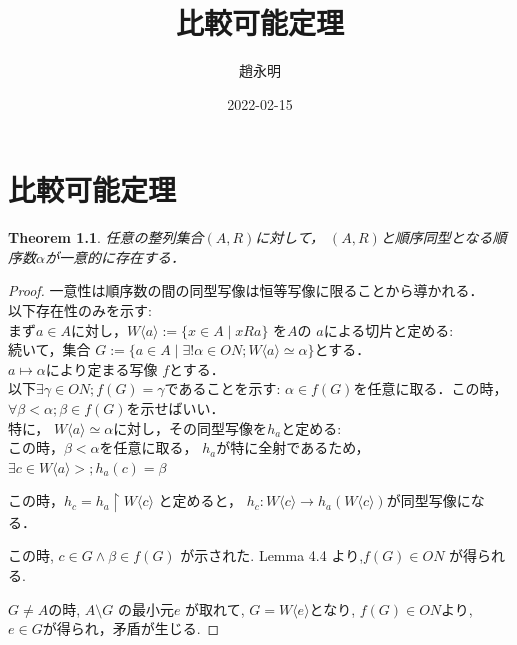 \documentclass[dvipdfmx]{jreport}
\newtheorem{theorem}{Theorem}[section]
\begin{document}
\title{比較可能定理}
\author{趙永明}
\date{2022-02-15}
\maketitle
\newpage
\tableofcontents
{}
\newpage
\chapter{比較可能定理}
\label{cha:比較可能定理}
\begin{theorem}
    任意の整列集合$(A,R)$に対して， $(A,R)$と順序同型となる順序数$\alpha$が一意的に存在する．
\end{theorem}
\begin{proof}
    一意性は順序数の間の同型写像は恒等写像に限ることから導かれる．\\
    以下存在性のみを示す:\\
    まず$a \in A$に対し，$W\langle a \rangle := \{ x \in A \mid xRa\} $ を$A$の $a$による切片と定める:\\
    続いて，集合 $G:=\{a \in A \mid \exists !\alpha \in ON; W \langle a \rangle \simeq \alpha \}$とする．\\
	$a \mapsto \alpha$により定まる写像 $f$とする．\\
以下$\exists \gamma \in ON; f(G) = \gamma$であることを示す:
	$\alpha \in f(G)$を任意に取る．この時， $\forall \beta  < \alpha ; \beta \in f(G)$を示せばいい．\\
	特に， $W \langle a \rangle \simeq \alpha$に対し，その同型写像を$h_a$と定める:\\
    この時，$\beta < \alpha$を任意に取る， $h_a$が特に全射であるため，$\exists c \in W\langle a\rangle>; h_a(c) = \beta$

	この時，$h_c = h_a\upharpoonright W \langle c \rangle $ と定めると，
$h_c : W\langle c \rangle \to h_a(W\langle c \rangle)$が同型写像になる．

この時, $c \in G \land \beta \in f\left( G \right) $ が示された. Lemma 4.4 より,$f\left( G \right)  \in ON$ が得られる.

$G \neq A$の時,  $A\setminus G$ の最小元$e$ が取れて, $G = W \langle e \rangle$となり, $f(G) \in ON$より,  $e \in G$が得られ，矛盾が生じる.

\end{proof}
\end{document}
